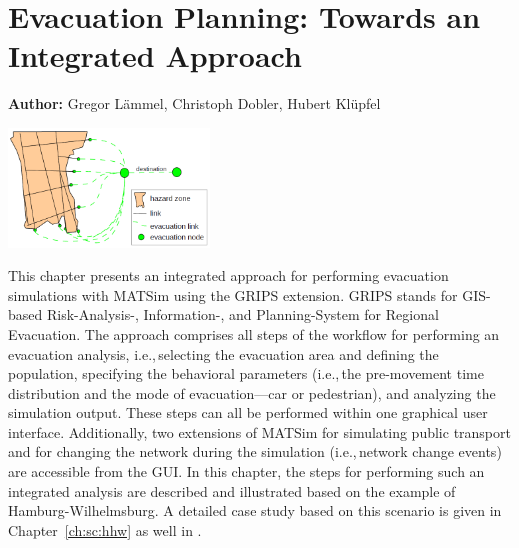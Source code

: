 \chapter{Evacuation Planning: Towards an Integrated Approach}
\label{ch:evacuation}

\hfill \textbf{Author:} Gregor Lämmel, Christoph Dobler, Hubert Klüpfel 

\begin{center} \includegraphics[width=0.4\textwidth, angle=0]{extending/figures/Evacuation/evacuation} \end{center}


This chapter presents an integrated approach for performing evacuation simulations with MATSim using the GRIPS extension. GRIPS stands for GIS-based Risk-Analysis-, Information-, and Planning-System for Regional Evacuation. 
The approach comprises all steps of the workflow for performing an evacuation analysis, i.e.,\,selecting the evacuation area and defining the population, specifying the behavioral parameters (i.e.,\,the pre-movement time distribution and the mode of evacuation---car or pedestrian), and analyzing the simulation output. These steps can all be performed within one graphical user interface. Additionally, two extensions of MATSim for simulating public transport and for changing the network during the simulation (i.e.,\,network change events) are accessible from the GUI. In this chapter, the steps for performing such an integrated analysis are described and illustrated based on the example of Hamburg-Wilhelmsburg. A detailed case study based on this scenario is given in Chapter~\ref{ch:sc:hhw} as well in \cite{DurstAtAl2012PEDGRIPSAppl,Hugenbusch2012Bachelor}.

